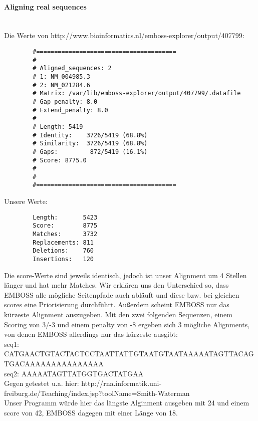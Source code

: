 \documentclass[a4paper,10pt]{article}
\begin{document}
	\paragraph{Aligning real sequences}\ \\
		Die Werte von http://www.bioinformatics.nl/emboss-explorer/output/407799: 
		\begin{verbatim}
		#=======================================
		#
		# Aligned_sequences: 2
		# 1: NM_004985.3
		# 2: NM_021284.6
		# Matrix: /var/lib/emboss-explorer/output/407799/.datafile
		# Gap_penalty: 8.0
		# Extend_penalty: 8.0
		#
		# Length: 5419
		# Identity:    3726/5419 (68.8%)
		# Similarity:  3726/5419 (68.8%)
		# Gaps:         872/5419 (16.1%)
		# Score: 8775.0
		# 
		#
		#=======================================
		\end{verbatim}
		Unsere Werte:
		\begin{verbatim}
		Length:       5423
		Score:        8775
		Matches:      3732
		Replacements: 811
		Deletions:    760
		Insertions:   120
		\end{verbatim}
		Die score-Werte sind jeweils identisch, jedoch ist unser Alignment um 4 Stellen länger und hat mehr Matches. Wir erklären uns den Unterschied so, dass EMBOSS alle mögliche Seitenpfade auch abläuft und diese bzw. bei gleichen scores eine Priorisierung durchführt. Außerdem scheint EMBOSS nur das  kürzeste Alignment auszugeben. Mit den zwei folgenden Sequenzen, einem Scoring von 3/-3 und einem penalty von -8 ergeben sich 3 mögliche Alignments, von denen EMBOSS allerdings nur das kürzeste ausgibt:\\
		seq1: CATGAACTGTACTACTCCTAATTATTGTAATGTAATAAAAATAGTTACAGTGACAAAAAAAAAAAAAAA\\
		seq2: AAAAATAGTTATGGTGACTATGAA\\
		Gegen getestet u.a. hier: http://rna.informatik.uni-freiburg.de/Teaching/index.jsp?toolName=Smith-Waterman\\
		Unser Programm würde hier das längste Alginment ausgeben mit 24 und einem score von 42, EMBOSS dagegen mit einer Länge von 18.
		
	
\end{document}
